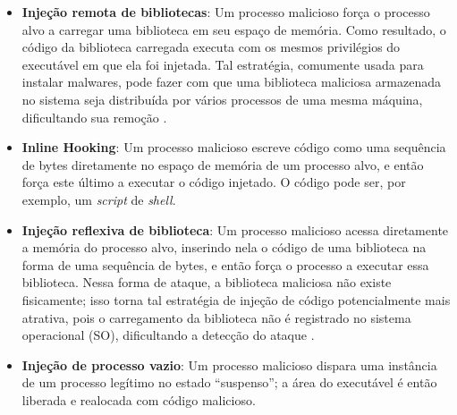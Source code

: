 \begin{itemize}
 \item \textbf{Injeção remota de bibliotecas}: Um processo malicioso força o processo alvo a carregar uma biblioteca em seu espaço de memória.
 Como resultado, o código da biblioteca carregada executa com os mesmos privilégios do executável em que ela foi injetada. 
 Tal estratégia, comumente usada para instalar malwares, pode fazer com que uma biblioteca maliciosa armazenada no sistema seja distribuída por vários processos de uma mesma máquina, dificultando sua remoção \cite{MillerRemoteLibraryInjection:2004}.
 
 \item \textbf{Inline Hooking}: Um processo malicioso escreve código como uma sequência de bytes diretamente no espaço de memória de um processo alvo, e então força este último a executar o código injetado. 
 O código pode ser, por exemplo, um \textit{script} de \textit{shell}.
 

 \item \textbf{Injeção reflexiva de biblioteca}: Um processo malicioso acessa diretamente a memória do processo alvo, inserindo nela o código de uma biblioteca na forma de uma sequência de bytes, e então força o processo a executar essa biblioteca. 
 Nessa forma de ataque, a biblioteca maliciosa não existe fisicamente; isso torna tal estratégia de injeção de código potencialmente mais atrativa, pois o carregamento da biblioteca não é registrado no sistema operacional (SO), dificultando a detecção do ataque \cite{FewerReflectiveLibraryInject:2008}.
 
 \item \textbf{Injeção de processo vazio}: Um processo malicioso dispara uma instância de um processo legítimo no estado ``suspenso''; a área do executável é então liberada e realocada com código malicioso.
\end{itemize}





